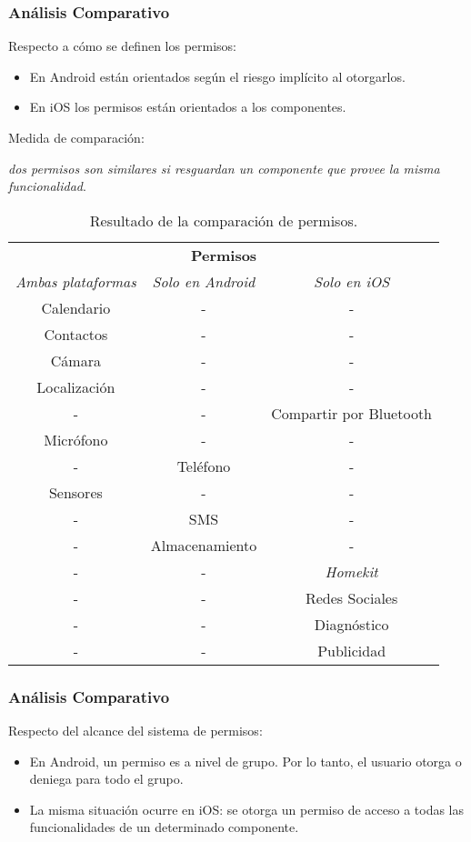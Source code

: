 \begin{frame}
 \frametitle{Análisis Comparativo}
Respecto a cómo se definen los permisos: \pause
 \begin{itemize}
  \item En Android están orientados según el riesgo implícito al otorgarlos.\pause
  \item En iOS los permisos están orientados a los componentes.\pause
 \end{itemize}
 \begin{block}{}
\begin{small}
Medida de comparación:
\end{small} \emph{dos permisos son similares si resguardan un componente que provee la misma funcionalidad}. 
 \end{block}\pause
  \begin{tiny}
  \begin{table}[H]
    \centering
	\begin{tabular}{c c c}
		\hline
		\multicolumn{3}{c}{\textbf{Permisos}} \\
		\emph{Ambas plataformas} 	& \emph{Solo en Android}	& \emph{Solo en iOS} \\ \hline    \hline
		Calendario	& -		& -	\\						
		Contactos	& -				& - \\						
		Cámara		& -				& -	\\						
		Localización& -				& -	\\						
		-			& -				& Compartir por Bluetooth\\ 
		Micrófono   & -				& - \\						
		-			& Teléfono		& -	\\						
		Sensores    & -    			& - \\						
		-			& SMS			& - \\						
		-			& Almacenamiento& - \\						
		-			& -				& \emph{Homekit} \\			
		-			& -				& Redes Sociales \\        	
		-			& -				& Diagnóstico \\        			
		-			& -				& Publicidad \\    			\hline
	\end{tabular}
	\caption{Resultado de la comparación de permisos.}
   \end{table}
   	\end{tiny}
\end{frame}
\begin{frame}
 \frametitle{Análisis Comparativo}
Respecto del alcance del sistema de permisos:\pause
  \begin{itemize}[<+->]
   \item En Android, un permiso es a nivel de grupo. Por lo tanto, el usuario otorga o deniega para todo el grupo.
   \item La misma situación ocurre en iOS: se otorga un permiso de acceso a todas las funcionalidades de un determinado componente.
  \end{itemize}
\end{frame}
